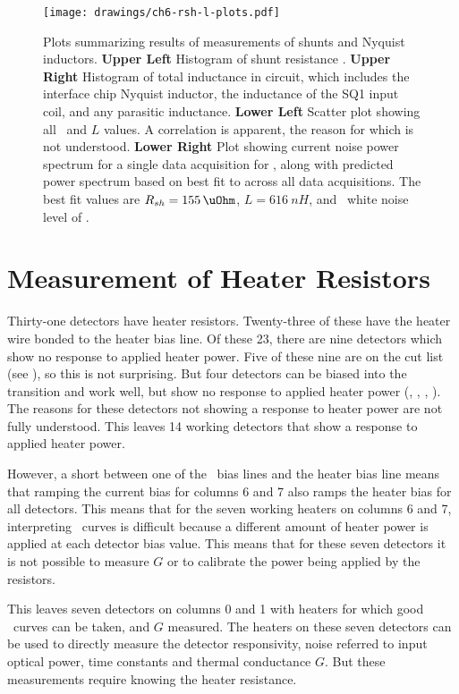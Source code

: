 \begin{figure*}
\texttt{[image: drawings/ch6-rsh-l-plots.pdf]}
\caption[Measurements of shunt resistors and Nyquist inductors]{
Plots summarizing results of measurements of shunts and Nyquist inductors.
\textbf{Upper Left} Histogram of shunt resistance \Rsh.
\textbf{Upper Right} Histogram of total inductance in circuit, which includes the interface chip Nyquist inductor, the inductance of the SQ1 input coil, and any parasitic inductance.
\textbf{Lower Left} Scatter plot showing all \Rsh\ and $L$ values. A correlation is apparent, the reason for which is not understood.
\textbf{Lower Right} Plot showing current noise power spectrum for a single data acquisition for , along with predicted power spectrum based on best fit to  across all data acquisitions. The best fit values are $\Rsh=\SI{155}{\uOhm}$, $L = \SI{616}{nH}$, and \SQUID\ white noise level of .}
\label{fig:rsh-l-plots}
\end{figure*}

\section{Measurement of Heater Resistors} \label{sec:heater-r}

Thirty-one detectors have heater resistors.
Twenty-three of these have the heater wire bonded to the heater bias line.
Of these 23, there are nine detectors which show no response to applied heater power.
Five of these nine are on the cut list (see ), so this is not surprising.
But four detectors can be biased into the transition and work well, but show no response to applied heater power (, , , ).
The reasons for these detectors not showing a response to heater power are not fully understood.
This leaves 14 working detectors that show a response to applied heater power.

However, a short between one of the \TES\ bias lines and the heater bias line means that ramping the current bias for columns 6 and 7 also ramps the heater bias for all detectors.
This means that for the seven working heaters on columns 6 and 7, interpreting \IV\ curves is difficult because a different amount of heater power is applied at each detector bias value.
This means that for these seven detectors it is not possible to measure $G$ or to calibrate the power being applied by the resistors.

This leaves seven detectors on columns 0 and 1 with heaters for which good \IV\ curves can be taken, and $G$ measured.
The heaters on these seven detectors can be used to directly measure the detector responsivity, noise referred to input optical power, time constants and thermal conductance $G$.
But these measurements require knowing the heater resistance.

